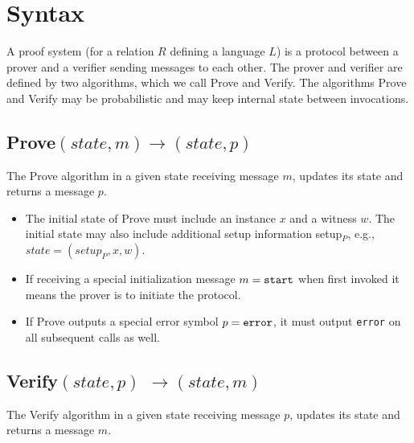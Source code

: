 \section{Syntax}
\label{security:syntax}
 
A proof system (for a relation $R$ defining a language $L$) is a protocol between a prover and a verifier sending messages to each other. 
The prover and verifier are defined by two algorithms, which we call Prove and Verify. 
The algorithms Prove and Verify may be probabilistic and may keep internal state between invocations.



\subsection[Prove]{\textbf{Prove}$(state, m) \rightarrow (state, p)$}
\label{security:syntax:prove}

The Prove algorithm in a given state receiving message $m$, updates its state and returns a message $p$.\loosen

\begin{itemize}
\item The initial state of Prove must include an instance $x$ and a witness $w$. 
	The initial state may also include additional setup information setup$_P$, e.g., $state = (setup_P, x, w)$.
\item If receiving a special initialization message $m = \tt start$ when first invoked it means the prover is to initiate the protocol.
\item If Prove outputs a special error symbol $p = \tt error$, it must output {\tt error} on all subsequent calls as well.
\end{itemize}


\subsection[Verify]{\textbf{Verify}$(state, p)$ $\rightarrow (state, m)$}
\label{security:syntax:verify}

The Verify algorithm in a given state receiving message $p$, updates its state and returns a message $m$.\loosen

